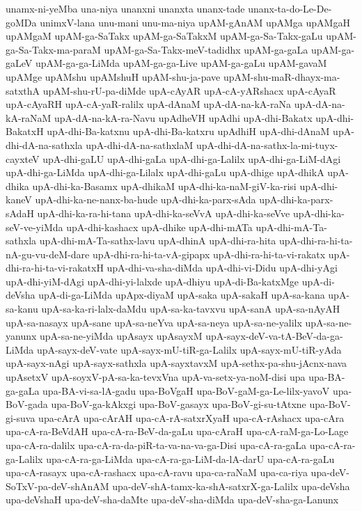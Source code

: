 {unamx-ni-yeMba
una-niya
unanxni
unanxta
unanx-tade
unanx-ta-do-Le-De-goMDa
unimxV-lana
unu-mani
unu-ma-niya
upAM-gAnAM
upAMga
upAMgaH
upAMgaM
upAM-ga-SaTakx
upAM-ga-SaTakxM
upAM-ga-Sa-Takx-gaLu
upAM-ga-Sa-Takx-ma-paraM
upAM-ga-Sa-Takx-meV-tadidhx
upAM-ga-gaLa
upAM-ga-gaLeV
upAM-ga-ga-LiMda
upAM-ga-ga-Live
upAM-ga-gaLu
upAM-gavaM
upAMge
upAMshu
upAMshuH
upAM-shu-ja-pave
upAM-shu-maR-dhayx-ma-satxthA
upAM-shu-rU-pa-diMde
upA-cAyAR
upA-cA-yARshacx
upA-cAyaR
upA-cAyaRH
upA-cA-yaR-ralilx
upA-dAnaM
upA-dA-na-kA-raNa
upA-dA-na-kA-raNaM
upA-dA-na-kA-ra-Navu
upAdheVH
upAdhi
upA-dhi-Bakatx
upA-dhi-BakatxH
upA-dhi-Ba-katxnu
upA-dhi-Ba-katxru
upAdhiH
upA-dhi-dAnaM
upA-dhi-dA-na-sathxla
upA-dhi-dA-na-sathxlaM
upA-dhi-dA-na-sathx-la-mi-tuyx-cayxteV
upA-dhi-gaLU
upA-dhi-gaLa
upA-dhi-ga-Lalilx
upA-dhi-ga-LiM-dAgi
upA-dhi-ga-LiMda
upA-dhi-ga-Lilalx
upA-dhi-gaLu
upA-dhige
upA-dhikA
upA-dhika
upA-dhi-ka-Basamx
upA-dhikaM
upA-dhi-ka-naM-giV-ka-risi
upA-dhi-kaneV
upA-dhi-ka-ne-nanx-ba-hude
upA-dhi-ka-parx-sAda
upA-dhi-ka-parx-sAdaH
upA-dhi-ka-ra-hi-tana
upA-dhi-ka-seVvA
upA-dhi-ka-seVve
upA-dhi-ka-seV-ve-yiMda
upA-dhi-kashacx
upA-dhike
upA-dhi-mATa
upA-dhi-mA-Ta-sathxla
upA-dhi-mA-Ta-sathx-lavu
upA-dhinA
upA-dhi-ra-hita
upA-dhi-ra-hi-ta-nA-gu-vu-deM-dare
upA-dhi-ra-hi-ta-vA-gipapx
upA-dhi-ra-hi-ta-vi-rakatx
upA-dhi-ra-hi-ta-vi-rakatxH
upA-dhi-va-sha-diMda
upA-dhi-vi-Didu
upA-dhi-yAgi
upA-dhi-yiM-dAgi
upA-dhi-yi-lalxde
upA-dhiyu
upA-di-Ba-katxMge
upA-di-deVsha
upA-di-ga-LiMda
upApx-diyaM
upA-saka
upA-sakaH
upA-sa-kana
upA-sa-kanu
upA-sa-ka-ri-lalx-daMdu
upA-sa-ka-tavxvu
upA-sanA
upA-sa-nAyAH
upA-sa-nasayx
upA-sane
upA-sa-neYva
upA-sa-neya
upA-sa-ne-yalilx
upA-sa-ne-yanunx
upA-sa-ne-yiMda
upAsayx
upAsayxM
upA-sayx-deV-va-tA-BeV-da-ga-LiMda
upA-sayx-deV-vate
upA-sayx-mU-tiR-ga-Lalilx
upA-sayx-mU-tiR-yAda
upA-sayx-nAgi
upA-sayx-sathxla
upA-sayxtavxM
upA-sethx-pa-shu-jAcnx-nava
upAsetxV
upA-soyxV-pA-sa-ka-tevxVna
upA-va-setx-ya-noM-disi
upa
upa-BA-ga-gaLa
upa-BA-vi-sa-lA-gadu
upa-BoVgaH
upa-BoV-gaM-ga-Le-lilx-yavoV
upa-BoV-gada
upa-BoV-ga-kAkxgi
upa-BoV-gasayx
upa-BoV-gi-su-tAtxne
upa-BoV-gi-suva
upa-cArA
upa-cArAH
upa-cA-rA-satxrXyaH
upa-cA-rAshacx
upa-cAra
upa-cA-ra-BeVdAH
upa-cA-ra-BeV-da-gaLu
upa-cAraH
upa-cA-raM-ga-Lo-Lage
upa-cA-ra-dalilx
upa-cA-ra-da-piR-ta-va-na-va-ga-Disi
upa-cA-ra-gaLa
upa-cA-ra-ga-Lalilx
upa-cA-ra-ga-LiMda
upa-cA-ra-ga-LiM-da-lA-darU
upa-cA-ra-gaLu
upa-cA-rasayx
upa-cA-rashacx
upa-cA-ravu
upa-ca-raNaM
upa-ca-riya
upa-deV-SoTxV-pa-deV-shAnAM
upa-deV-shA-tamx-ka-shA-satxrX-ga-Lalilx
upa-deVsha
upa-deVshaH
upa-deV-sha-daMte
upa-deV-sha-diMda
upa-deV-sha-ga-Lanunx
}
